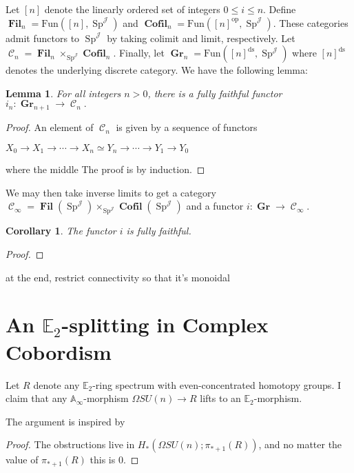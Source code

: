 \documentclass[oneside]{amsart}
\theoremstyle{definition}
\theoremstyle{plain}
\newtheorem{lem}[nul]{Lemma}
\newtheorem{cor}{Corollary}[nul]
\DeclareMathOperator{\C}{\mathcal{C}}
\DeclareMathOperator{\Gr}{\textbf{Gr}}
\DeclareMathOperator{\Fil}{\textbf{Fil}}
\DeclareMathOperator{\Sp}{\text{Sp}}
\DeclareMathOperator{\J}{\mathcal{J}}
\DeclareMathOperator{\Cofil}{\textbf{Cofil}}
\begin{document}
Let $[n]$ denote the linearly ordered set of integers $0\leq i\leq n$.  Define $\Fil_n = \text{Fun}([n], \Sp^{\J})$ and $\Cofil_n = \text{Fun}([n]^{\text{op}},\Sp^{\J})$.  These categories admit functors to $\Sp^{\J}$ by taking colimit and limit, respectively.  Let $\C_n = \Fil_n \times_{\Sp^{\J}} \Cofil_n.$  Finally, let $\Gr_n = \text{Fun}([n]^{\text{ds}}, \Sp^{\J})$ where $[n]^{\text{ds}}$ denotes the underlying discrete category.  We have the following lemma:

\begin{lem}
For all integers $n>0$, there is a fully faithful functor $i_n:\Gr_{n+1} \to \C_n.$  
\end{lem}
\begin{proof}
An element of $\C_n$ is given by a sequence of functors 
\begin{center}
$X_0 \longrightarrow X_1 \longrightarrow \cdots \longrightarrow X_n \simeq Y_n \longrightarrow \cdots \longrightarrow Y_1 \longrightarrow Y_0$ 
\end{center}
where the middle 
The proof is by induction.  
\end{proof}

We may then take inverse limits to get a category $\C_\infty = \Fil(\Sp^{\J}) \times_{\Sp^{\J}} \Cofil(\Sp^{\J})$ and a functor $i: \Gr \to \C_\infty$. 

\begin{cor}
The functor $i$ is fully faithful.
\end{cor}
\begin{proof}
\end{proof}

at the end, restrict connectivity so that it's monoidal

\section{An \texorpdfstring{$\mathbb{E}_2$}{E2}-splitting in Complex Cobordism} \label{sec:MUE2}

Let $R$ denote any $\mathbb{E}_2$-ring spectrum with even-concentrated homotopy groups.  I claim that any $\mathbb{A}_\infty$-morphism $\Omega SU(n) \rightarrow R$ lifts to an $\mathbb{E}_2$-morphism.

The argument is inspired by \cite{ChadwickMandell}
\begin{proof}
The obstructions live in $H_*(\Omega SU(n);\pi_{*+1}(R))$, and no matter the value of $\pi_{*+1}(R)$ this is $0$.
\end{proof}
\end{document}
